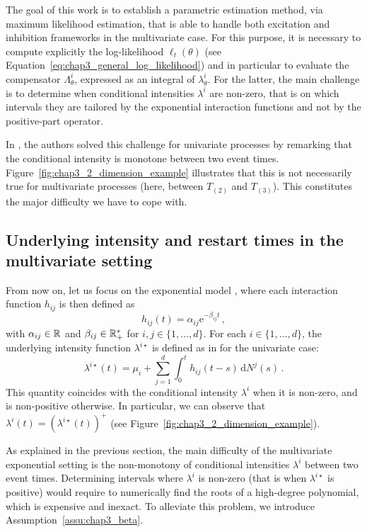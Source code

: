     The goal of this work is to establish a parametric estimation method, via maximum likelihood estimation, that is able to handle both excitation and inhibition frameworks in the multivariate case.
    For this purpose, it is necessary to compute explicitly the log-likelihood \(\ell_t(\theta)\) (see Equation~\eqref{eq:chap3_general_log_likelihood}) and in particular to evaluate the compensator \(\Lambda_\theta^i\), expressed as an integral of \(\lambda_\theta^i\).
    For the latter, the main challenge is to determine when conditional intensities \(\lambda^i\) are non-zero, that is on which intervals they are tailored by the exponential interaction functions and not by the positive-part operator.

    In \textcite{bonnet2021}, the authors solved this challenge for univariate processes by remarking that the conditional intensity is monotone between two event times.
    Figure~\ref{fig:chap3_2_dimension_example} illustrates that this is not necessarily true for multivariate processes (here, between \(T_{(2)}\) and \(T_{(3)}\)).
    This constitutes the major difficulty we have to cope with.

  \subsection{Underlying intensity and restart times in the multivariate setting}

    From now on, let us focus on the exponential model \parencite{Hawkes1971}, where each interaction function $h_{ij}$ is then defined as
    \[h_{ij}(t) = \alpha_{ij}\mathrm{e}^{-\beta_{ij}t}\,,\]
    with $\alpha_{ij}\in{\mathbb R}$ and $\beta_{ij}\in{\mathbb R}_+^*$ for $i,j\in \{1,\ldots, d\}$.
    For each $i\in\{1,\ldots, d\}$, the underlying intensity function $\lambda^{i\star}$ is defined as in \textcite{bonnet2021} for the univariate case:
    \[\lambda^{i\star}(t) = \mu_i + \sum_{j=1}^{d}{\int_{0}^{t}{h_{ij}(t-s)\,\mathrm{d}N^j(s)}}\,.\]
    This quantity coincides with the conditional intensity \(\lambda^i\) when it is non-zero, and is non-positive otherwise.
    In particular, we can observe that \(\lambda^i (t) = \left( \lambda^{i\star}(t) \right)^+\) (see Figure~\ref{fig:chap3_2_dimension_example}).

    As explained in the previous section, the main difficulty of the multivariate exponential setting is the non-monotony of conditional intensities \(\lambda^i\) between two event times.
    Determining intervals where \(\lambda^i\) is non-zero (that is when \(\lambda^{i\star}\) is positive) would require to numerically find the roots of a high-degree polynomial, which is expensive and inexact.
    To alleviate this problem, we introduce Assumption~\ref{assu:chap3_beta}.

